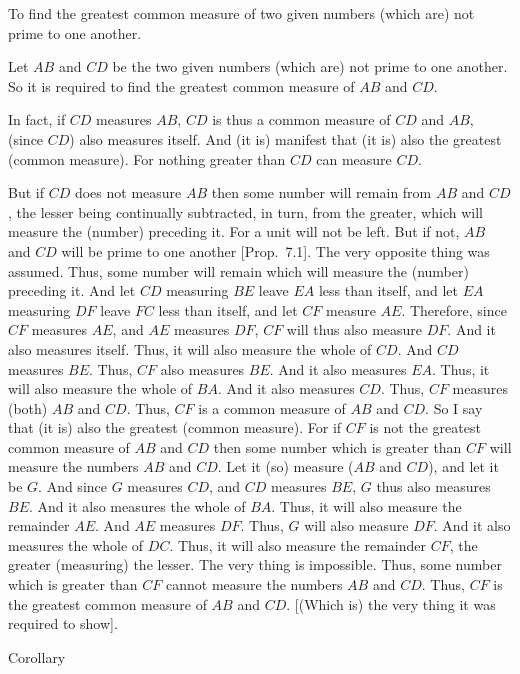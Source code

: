 To find the greatest common measure of two given numbers (which are) not prime to one
another.

\epsfysize=1.8in
\centerline{}

Let $AB$ and $CD$ be the two given numbers (which are) not prime to one another.
So it is required to find the greatest common measure of $AB$ and $CD$.

In fact, if $CD$ measures $AB$,
$CD$ is thus a common measure of $CD$ and $AB$, (since $CD$) also measures itself. And  (it is) manifest that
(it is) also the greatest (common measure). For nothing greater than $CD$ can
measure $CD$.

But if $CD$ does not measure $AB$ then some number will
remain from $AB$ and $CD$,  the lesser being continually subtracted, in turn, from the greater,  which will measure the (number) preceding it. For a unit
will not be left. But if not, $AB$ and $CD$ will be prime to one another [Prop.~7.1]. The very opposite thing was assumed.
Thus, some number will remain which will measure the (number) preceding
it. And let $CD$ measuring $BE$ leave $EA$ less than itself, and let $EA$ measuring
$DF$ leave $FC$ less than itself, and let $CF$ measure $AE$. Therefore, since
$CF$ measures $AE$, and $AE$ measures $DF$, $CF$ will thus also measure
$DF$. And it also measures itself. Thus, it will also measure the whole of
$CD$. And $CD$ measures $BE$. Thus, $CF$ also measures $BE$. And it
also
measures $EA$. Thus, it
will also measure the whole of $BA$. And it also measures $CD$. Thus,
$CF$ measures (both) $AB$ and $CD$. Thus, $CF$ is a common measure of
$AB$ and $CD$. So I say that (it is) also the greatest (common measure).
For if $CF$ is not the greatest common measure of $AB$ and $CD$ then some number
which is greater than $CF$ will measure the numbers $AB$ and $CD$.
Let it (so) measure ($AB$ and $CD$), and let it be $G$. And since $G$ measures
$CD$, and $CD$ measures $BE$, $G$ thus also measures $BE$. And it also measures
the whole of $BA$. Thus, it will also measure the remainder $AE$. And 
$AE$ measures $DF$. Thus, $G$ 
will also measure $DF$. And it also
measures the whole of $DC$. Thus, it will also measure the remainder
$CF$, the greater (measuring) the lesser. The very thing is impossible.
Thus, some number which is greater than $CF$ cannot measure the numbers
$AB$ and $CD$. Thus, $CF$ is the greatest common measure of $AB$ and $CD$.
[(Which is) the very thing it was required to show].\\

\begin{center}
{\large Corollary}
\end{center}\vspace*{-7pt}

